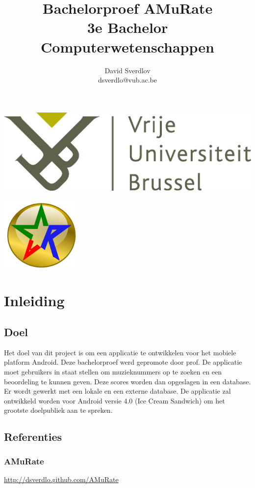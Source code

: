 \documentclass[11pt,a4paper]{article}
\author{David Sverdlov \\ dsverdlo@vub.ac.be}
\title{Bachelorproef AMuRate\\ 3e Bachelor Computerwetenschappen}
\begin{document}
\begin{flushleft}
\noindent \includegraphics[width=0.6\linewidth]{vub_logo.jpg} 
\end{flushleft}
{\let\newpage\relax\maketitle} %

\begin{center}
\includegraphics[width=4cm]{amr_gold_thick.png} 
\end{center}



\newpage
\tableofcontents

\newpage
\section{Inleiding}
	\subsection{Doel}
Het doel van dit project is om een applicatie te ontwikkelen voor het mobiele platform Android. Deze bachelorproef werd gepromote door prof. De applicatie moet gebruikers in staat stellen om muzieknummers op te zoeken en een beoordeling te kunnen geven. Deze scores worden dan opgeslagen in een database. Er wordt gewerkt met een lokale en een externe database. De applicatie zal ontwikkeld worden voor Android versie 4.0 (Ice Cream Sandwich) om het grootste doelpubliek aan te spreken.

	\subsection{Referenties}
		\subsubsection{AMuRate}
			\url{http://dsverdlo.github.com/AMuRate}
\end{document}
